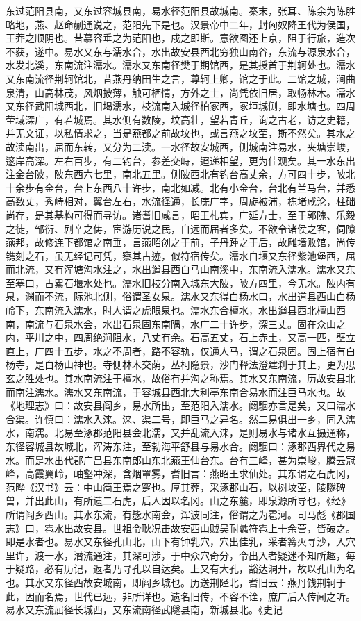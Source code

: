 \documentclass[12pt,UTF8]{ctexbook}
\begin{document}
东过范阳县南，又东过容城县南，易水径范阳县故城南。秦末，张耳、陈余为陈胜略地，燕、赵命蒯通说之，范阳先下是也。汉景帝中二年，封匈奴降王代为侯国，王莽之顺阴也。昔慕容垂之为范阳也，戍之即斯。意欲图还上京，阻于行旅，造次不获，遂中。易水又东与濡水合，水出故安县西北穷独山南谷，东流与源泉水合，水发北溪，东南流注濡水。濡水又东南径樊于期馆西，是其授首于荆轲处也。濡水又东南流径荆轲馆北，昔燕丹纳田生之言，尊轲上卿，馆之于此。二馆之城，涧曲泉清，山高林茂，风烟披薄，触可栖情，方外之士，尚凭依旧居，取畅林木。濡水又东径武阳城西北，旧堨濡水，枝流南入城径柏冢西，冢垣城侧，即水塘也。四周茔域深广，有若城焉。其水侧有数陵，坟高壮，望若青丘，询之古老，访之史籍，并无文证，以私情求之，当是燕都之前故坟也，或言燕之坟茔，斯不然矣。其水之故渎南出，屈而东转，又分为二渎。一水径故安城西，侧城南注易水，夹塘崇峻，邃岸高深。左右百步，有二钓台，参差交峙，迢递相望，更为佳观矣。其一水东出注金台陂，陂东西六七里，南北五里。侧陂西北有钓台高丈余，方可四十步，陂北十余步有金台，台上东西八十许步，南北如减。北有小金台，台北有兰马台，并悉高数丈，秀峙相对，翼台左右，水流径通，长庑广字，周旋被浦，栋堵咸沦，柱础尚存，是其基构可得而寻访。诸耆旧咸言，昭王札宾，广延方士，至于郭隗、乐毅之徒，邹衍、剧辛之俦，宦游历说之民，自远而届者多矣。不欲令诸侯之客，伺隙燕邦，故修连下都馆之南垂，言燕昭创之于前，子丹踵之于后，故雕墙败馆，尚传镌刻之石，虽无经记可凭，察其古迹，似符宿传矣。濡水自堰又东径紫池堡西，屈而北流，又有浑塘沟水注之，水出遒县西白马山南溪中，东南流入濡水。濡水又东至塞口，古累石堰水处也。濡水旧枝分南入城东大陂，陂方四里，今无水。陂内有泉，渊而不流，际池北侧，俗谓圣女泉。濡水又东得白杨水口，水出道县西山白杨岭下，东南流入濡水，时人谓之虎眼泉也。濡水东合檀水，水出遒县西北檀山西南，南流与石泉水会，水出石泉固东南隅，水广二十许步，深三丈。固在众山之内，平川之中，四周绝涧阻水，八丈有余。石高五丈，石上赤土，又高一匹，壁立直上，广四十五步，水之不周者，路不容轨，仅通人马，谓之石泉固。固上宿有白杨寺，是白杨山神也。寺侧林木交荫，丛柯隐景，沙门释法澄建刹于其上，更为思玄之胜处也。其水南流注于檀水，故俗有并沟之称焉。其水又东南流，历故安县北而南注濡水。濡水又东南流，于容城县西北大利亭东南合易水而注巨马水也。故《地理志》曰：故安县阎乡，易水所出，至范阳入濡水。阚駰亦言是矣，又曰濡水合渠。许慎曰：濡水入涞。涞、渠二号，即巨马之异名。然二易俱出一乡，同入濡水，南濡。北易至涿郡范阳县会北濡，又并乱流入涞，是则易水与诸水互摄通称，东径容城县故城北，浑涛东注，至勃海平舒县与易水合。阚駰曰：涿郡西界代之易水。而是水出代郡广昌县东南郎山东北燕王仙台东。台有三峰，甚为崇峻，腾云冠峰，高霞翼岭，岫壑冲深，含烟罩雾，耆旧言：燕昭王求仙处。其东谓之石虎冈，范晔《汉书》云：中山简王焉之窆也。厚其葬，采涿郡山石，以树坟茔，陵隧碑兽，并出此山，有所遗二石虎，后人因以名冈。山之东麓，即泉源所导也，《经》所谓阎乡西山。其水东流，有毖水南会，浑波同注，俗谓之为雹河。司马彪《郡国志》曰，雹水出故安县。世祖令耿况击故安西山贼吴耐蠡符雹上十余营，皆破之。即是水者也。易水又东径孔山北，山下有钟乳穴，穴出佳乳，采者篝火寻沙，入穴里许，渡一水，潜流通注，其深可涉，于中众穴奇分，令出入者疑迷不知所趣，每于疑路，必有历记，返者乃寻孔以自达矣。上又有大孔，豁达洞开，故以孔山为名也。其水又东径西故安城南，即阎乡城也。历送荆陉北，耆旧云：燕丹饯荆轲于此，因而名焉，世代已远，非所详也。遗名旧传，不容不诠，庶广后人传闻之听。易水又东流屈径长城西，又东流南径武隧县南，新城县北。《史记
\end{document}
